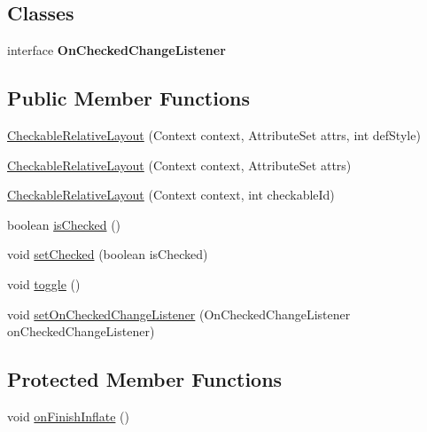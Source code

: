 \subsection*{Classes}
\begin{DoxyCompactItemize}
\item 
interface {\bfseries On\+Checked\+Change\+Listener}
\end{DoxyCompactItemize}
\subsection*{Public Member Functions}
\begin{DoxyCompactItemize}
\item 
\hyperlink{classandroid_1_1app_1_1printerapp_1_1util_1_1ui_1_1_checkable_relative_layout_a00258b014953caf1de2b96e82b55cf5a}{Checkable\+Relative\+Layout} (Context context, Attribute\+Set attrs, int def\+Style)
\item 
\hyperlink{classandroid_1_1app_1_1printerapp_1_1util_1_1ui_1_1_checkable_relative_layout_aeee33bc4ca99c225bb1561792047521b}{Checkable\+Relative\+Layout} (Context context, Attribute\+Set attrs)
\item 
\hyperlink{classandroid_1_1app_1_1printerapp_1_1util_1_1ui_1_1_checkable_relative_layout_acb33483f6dde27d1b80c63bc77b6ce43}{Checkable\+Relative\+Layout} (Context context, int checkable\+Id)
\item 
boolean \hyperlink{classandroid_1_1app_1_1printerapp_1_1util_1_1ui_1_1_checkable_relative_layout_a7d7efd063a08d61d6e1ef5e31ed9531d}{is\+Checked} ()
\item 
void \hyperlink{classandroid_1_1app_1_1printerapp_1_1util_1_1ui_1_1_checkable_relative_layout_a0e6454f42f29060a5a612222298ef979}{set\+Checked} (boolean is\+Checked)
\item 
void \hyperlink{classandroid_1_1app_1_1printerapp_1_1util_1_1ui_1_1_checkable_relative_layout_a4df395b5ccea523f98939721eb04b81d}{toggle} ()
\item 
void \hyperlink{classandroid_1_1app_1_1printerapp_1_1util_1_1ui_1_1_checkable_relative_layout_ab55d4ad10352d792892087da8b8d882d}{set\+On\+Checked\+Change\+Listener} (On\+Checked\+Change\+Listener on\+Checked\+Change\+Listener)
\end{DoxyCompactItemize}
\subsection*{Protected Member Functions}
\begin{DoxyCompactItemize}
\item 
void \hyperlink{classandroid_1_1app_1_1printerapp_1_1util_1_1ui_1_1_checkable_relative_layout_ade466eb6d0dde1e0ef7d09c24b75417d}{on\+Finish\+Inflate} ()
\end{DoxyCompactItemize}


